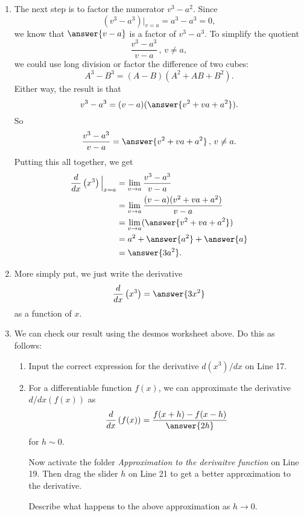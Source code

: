 \documentclass{ximera}
\begin{document}
\begin{exploration}
\begin{enumerate}
\item The next step is to factor the numerator $v^3-a^2$. Since 
\[
     (v^3 - a^3)\Big|_{v=a} = a^3 - a^3 = 0 ,
\]
we know that $\answer{v-a}$ is a factor of $v^3-a^3$. To simplify the quotient
\[
  \frac{v^3-a^3}{v-a} \, , \, v\neq a,
\]
we could use long division or factor the difference of two cubes:
\[
   A^3 - B^3 = (A-B)(A^2 + AB + B^2).
\]
Either way, the result is that
\[
     v^3 - a^3 = (v-a)(\answer{v^2 + va + a^2}).
\]
So
\[
   \frac{v^3-a^3}{v-a} = \answer{v^2+va+a^2} \, , \, v\neq a.
\]
Putting this all together, we get
\begin{align*}
\frac{d}{dx}\left( x^3 \right)\Big|_{x=a}  & = \lim_{v\to a} \frac{v^3-a^3}{v-a} \\
                                                              &= \lim_{v\to a} \frac{(v-a)(v^2+va+a^2)}{v-a} \\
                                                             & = \lim_{v\to a}(\answer{v^2 + va + a^2}) \\
                                                            & = a^2 + \answer{a^2} + \answer{a} \\
                                                            & = \answer{3a^2} .
\end{align*}

\item More simply put, we just write the derivative
\[
   \frac{d}{dx}\left( x^3  \right) = \answer{3x^2}
\]
as a function of $x$.

\item We can check our result using the desmos worksheet above. Do this as follows:

\begin{enumerate}

\item Input the correct expression for the derivative $d(x^3)/dx$ on Line 17.

\item For a differentiable function $f(x)$, we can approximate the derivative $d/dx(f(x))$ as
\[
  \frac{d}{dx}\left( f(x)  \right) = \frac{f(x+h) - f(x-h)}{\answer{2h}}
\]
for $h\sim 0$.

Now activate the folder \emph{Approximation to the derivaitve function} on Line 19. Then drag the slider $h$ on Line 21 to get a better approximation to the derivative.

\begin{freeResponse}
Describe what happens to the above approximation as $h \to 0$.
\end{freeResponse}



\end{enumerate}

\end{enumerate}


\end{exploration}
\end{document}
